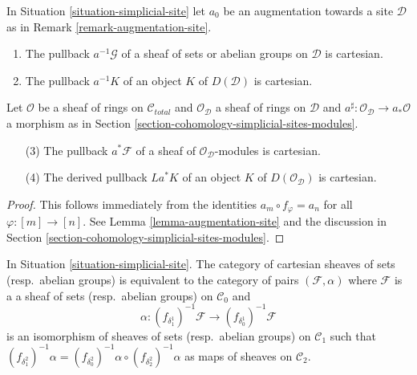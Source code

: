 \begin{lemma}
\label{lemma-augmentation-cartesian-module}
In Situation \ref{situation-simplicial-site} let
$a_0$ be an augmentation towards a site $\mathcal{D}$ as in
Remark \ref{remark-augmentation-site}.
\begin{enumerate}
\item The pullback $a^{-1}\mathcal{G}$ of a sheaf of sets or abelian groups
on $\mathcal{D}$ is cartesian.
\item The pullback $a^{-1}K$ of an object $K$ of $D(\mathcal{D})$
is cartesian.
\end{enumerate}
Let $\mathcal{O}$ be a sheaf of rings on $\mathcal{C}_{total}$ and
$\mathcal{O}_\mathcal{D}$ a sheaf of rings on $\mathcal{D}$
and $a^\sharp : \mathcal{O}_\mathcal{D} \to a_*\mathcal{O}$ a
morphism as in Section \ref{section-cohomology-simplicial-sites-modules}.
\begin{enumerate}
\item[(3)] The pullback $a^*\mathcal{F}$ of a sheaf of
$\mathcal{O}_\mathcal{D}$-modules is cartesian.
\item[(4)] The derived pullback $La^*K$ of an object
$K$ of $D(\mathcal{O}_\mathcal{D})$ is cartesian.
\end{enumerate}
\end{lemma}

\begin{proof}
This follows immediately from the identities
$a_m \circ f_\varphi = a_n$ for all $\varphi : [m] \to [n]$.
See Lemma \ref{lemma-augmentation-site} and the discussion in
Section \ref{section-cohomology-simplicial-sites-modules}.
\end{proof}

\begin{lemma}
\label{lemma-characterize-cartesian}
In Situation \ref{situation-simplicial-site}.
The category of cartesian sheaves of sets (resp.\ abelian groups)
is equivalent to the category of pairs $(\mathcal{F}, \alpha)$
where $\mathcal{F}$ is a a sheaf of sets (resp.\ abelian groups)
on $\mathcal{C}_0$ and
$$
\alpha :
(f_{\delta_1^1})^{-1}\mathcal{F}
\longrightarrow (f_{\delta_0^1})^{-1}\mathcal{F}
$$
is an isomorphism of sheaves of sets (resp.\ abelian groups)
on $\mathcal{C}_1$ such that
$(f_{\delta^2_1})^{-1}\alpha =
(f_{\delta^2_0})^{-1}\alpha \circ (f_{\delta^2_2})^{-1}\alpha$
as maps of sheaves on $\mathcal{C}_2$.
\end{lemma}

